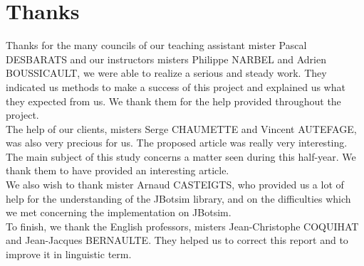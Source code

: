 \chapter*{Thanks}

Thanks for the many councils of our teaching assistant mister Pascal DESBARATS and our instructors misters Philippe NARBEL and Adrien BOUSSICAULT, we were able to realize a serious and steady work. They indicated us methods to make a success of this project and explained us what they expected from us. We thank them for the help provided throughout the project.\\

The help of our clients, misters Serge CHAUMETTE and Vincent AUTEFAGE, was also very precious for us. The proposed article was really very interesting. The main subject of this study concerns a matter seen during this half-year. We thank them to have provided an interesting article.\\

We also wish to thank mister Arnaud CASTEIGTS, who provided us a lot of help for the understanding of the JBotsim library, and on the difficulties which we met concerning the implementation on JBotsim.\\

To finish, we thank the English professors, misters Jean-Christophe COQUIHAT and Jean-Jacques BERNAULTE. They helped us to correct this report and to improve it in linguistic term.